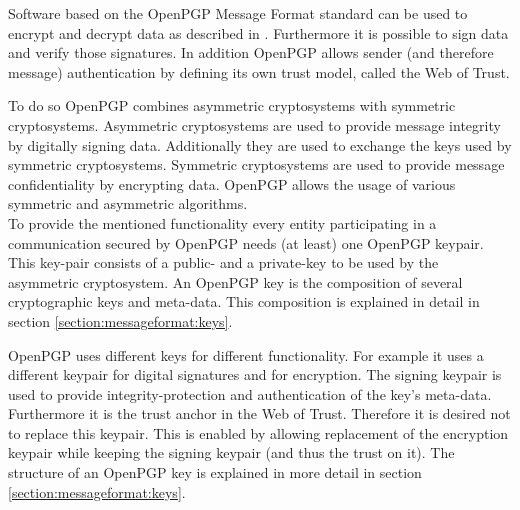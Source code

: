 Software based on the OpenPGP Message Format standard can be used to encrypt and decrypt data as described in \cite[section 2]{RFC4880}. Furthermore it is possible to sign data and verify those signatures. In addition OpenPGP allows sender (and therefore message) authentication by defining its own trust model, called the Web of Trust. 

To do so OpenPGP combines asymmetric cryptosystems with symmetric cryptosystems. Asymmetric cryptosystems are used to provide message integrity by digitally signing data. Additionally they are used to exchange the keys used by symmetric cryptosystems. Symmetric cryptosystems are used to provide message confidentiality by encrypting data. OpenPGP allows the usage of various symmetric and asymmetric algorithms. \\



To provide the mentioned functionality every entity participating in a communication secured by OpenPGP needs (at least) one OpenPGP keypair. This key-pair consists of a public- and a private-key to be used by the asymmetric cryptosystem. An OpenPGP key is the composition of several cryptographic keys and meta-data. This composition is explained in detail in section \ref{section:messageformat:keys}. 


OpenPGP uses different keys for different functionality. For example it uses a different keypair for digital signatures and for encryption. The signing keypair is used to provide integrity-protection and authentication of the key's meta-data. Furthermore it is the trust anchor in the Web of Trust. Therefore it is desired not to replace this keypair. This is enabled by allowing replacement of the encryption keypair while keeping the signing keypair (and thus the trust on it). The structure of an OpenPGP key is explained in more detail in section \ref{section:messageformat:keys}. \\


